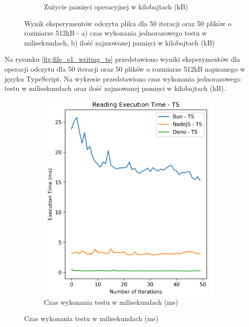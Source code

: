 \begin{figure}[H]
\begin{subfigure}[b]{0.4\textwidth}
    \caption{Zużycie pamięci operacyjnej w kilobajtach (kB)}
    \label{fig:file_e1_reading_ts_memory}
  \end{subfigure}
  \caption{Wynik eksperymentów odczytu pliku dla 50 iteracji oraz 50 plików o rozmiarze 512kB - a) czas wykonania jednorazowego testu w milisekundach, b) ilość zajmowanej pamięci w kilobajtach (kB)}
  \label{fig:file_e1_reading_ts}
\end{figure}

Na rysunku \ref{fig:file_e1_writing_ts} przedstawiono wyniki eksperymentów dla operacji odczytu dla 50 iteracji oraz 50 plików o rozmiarze 512kB napisanego w języku TypeScript. Na wykresie przedstawiono czas wykonania jednorazowego testu w milisekundach oraz ilość zajmowanej pamięci w kilobajtach (kB).

\begin{figure}[H]
  \centering
  \begin{subfigure}[b]{0.4\textwidth}
    \centering
    \includegraphics[width=\textwidth]{Figures/files/files_writing_50_500_50_ts_time.png}
    \caption{Czas wykonania testu w milisekundach (ms)}
    \label{fig:file_e1_writing_ts_time}
  \end{subfigure}

\end{figure}
